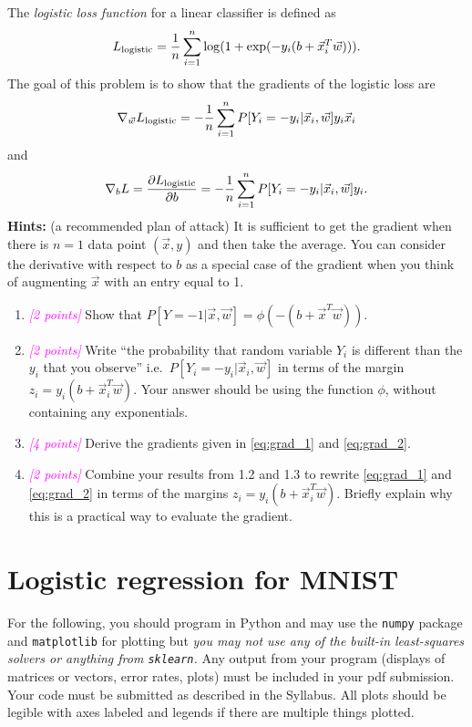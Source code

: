 \documentclass{article}
\newcommand{\points}[1]{\small\textcolor{magenta}{\emph{[#1 points]}} \normalsize}
\begin{document}
The {\em logistic loss function} for a linear classifier is defined as
\begin{equation*}
L_{\rm logistic} = 
\frac{1}{n} \sum_{i=1}^n \log(1 + \exp(-y_i (b + \vec x_i^T \vec w))).
\end{equation*}
The goal of this problem is to show that the gradients of the logistic loss are
\begin{equation}
  \label{eq:grad_1}
  \nabla_{\vec w} L_{\rm logistic} 
  = -\frac{1}{n} \sum_{i=1}^n P[Y_i = -y_i | \vec x_i, \vec w] y_i \vec x_i
\end{equation}
and
\begin{equation}
  \label{eq:grad_2}
  \nabla_{b} L = \frac{\partial L_{\rm logistic}}{\partial b}
  = -\frac{1}{n} \sum_{i=1}^n P[Y_i = -y_i | \vec x_i, \vec w] y_i .
\end{equation}
{\bf Hints:} (a recommended plan of attack)
It is sufficient to get the gradient when there is $n=1$ data point
$(\vec x, y)$
and then take the average.
You can consider the derivative with respect to $b$ as a special case of the
gradient when you think of augmenting $\vec x$ with an entry equal to 1.
\begin{enumerate}
\item \points{2} Show that $P[Y = -1 | \vec x, \vec w] = \phi(-(b + \vec x^T \vec w))$.
\item \points{2} Write ``the probability that random variable $Y_i$ 
  is different than the $y_i$ that you observe'' 
  i.e.\ $P[Y_i = -y_i | \vec x_i, \vec w]$ in terms of the margin
  $z_i = y_i (b + \vec x_i^T \vec w)$.
  Your answer should be using the function $\phi$, without containing any exponentials.
\item \points{4} Derive the gradients given in \eqref{eq:grad_1} and \eqref{eq:grad_2}.
\item \points{2} Combine your results from 1.2 and 1.3 to rewrite
  \eqref{eq:grad_1} and \eqref{eq:grad_2} in terms of the margins
  $z_i = y_i (b + \vec x_i^T \vec w)$.
  Briefly explain why this is a practical way to evaluate the gradient.
\end{enumerate}


\section*{Logistic regression for MNIST}


For the following, you should program in Python and may use the
{\tt numpy} package and {\tt matplotlib} for plotting
but {\em you may not use any of the built-in least-squares solvers or anything from 
{\tt sklearn}.}
Any output from your program (displays of matrices or vectors, error rates, plots) 
must be included in your pdf submission.
Your code must be submitted as described in the Syllabus.
All plots should be legible with axes labeled and legends 
if there are multiple things plotted.
\end{document}
